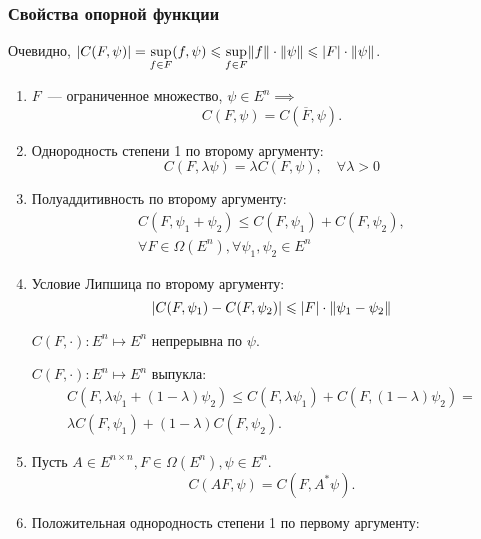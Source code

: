 \subsubsection{Свойства опорной функции}
Очевидно, $|C(F, \psi)| = \sup\limits_{f \in F} (f, \psi) \leqslant \sup\limits_{f \in F} \lVert f \rVert \cdot \lVert \psi \rVert \leqslant |F| \cdot \lVert \psi \rVert$.
\begin{enumerate}
    \item $F$~--- ограниченное множество, $\psi \in E^n \implies$ \begin{equation*}
        C(F, \psi) = C(\overline{F}, \psi).
    \end{equation*}
    \item Однородность степени 1 по второму аргументу: \begin{equation*}
        C(F, \lambda \psi) = \lambda C(F, \psi), \quad \forall \lambda > 0
    \end{equation*}
    \item Полуаддитивность по второму аргументу: \begin{align*}
        C(F, \psi_1 + \psi_2) \leqslant C(F, \psi_1) + C(F, \psi_2), \\
        \forall F \in \Omega(E^n), \forall \psi_1, \psi_2 \in E^n
    \end{align*}
    \item Условие Липшица по второму аргументу: \begin{equation*}
        |C(F, \psi_1) - C(F, \psi_2)| \leqslant |F| \cdot \lVert \psi_1 - \psi_2 \rVert
    \end{equation*}
    \begin{rmrk}
        $C(F, \cdot)\colon E^n \mapsto E^n$ непрерывна по $\psi$.
    \end{rmrk}
    \begin{rmrk}
        $C(F, \cdot)\colon E^n \mapsto E^n$ выпукла:
        \begin{gather*}
            C(F, \lambda \psi_1 + (1 - \lambda) \psi_2) \leqslant C(F, \lambda \psi_1) + C(F, (1 - \lambda) \psi_2) = \\
            \lambda C(F, \psi_1) + (1 - \lambda) C(F, \psi_2).
        \end{gather*}
    \end{rmrk}
    \item Пусть $A \in E^{n \times n}, F \in \Omega(E^n), \psi \in E^n$. 
    \begin{equation*}
        C(AF, \psi) = C(F, A^*\psi).
    \end{equation*}
    \item Положительная однородность степени 1 по первому аргументу: \begin{equation*}

\end{equation*}
\end{enumerate}
